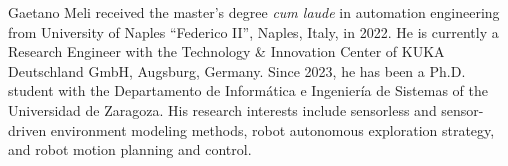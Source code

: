 
\begin{IEEEbiography}
	{Gaetano Meli}
	received the master’s degree \textit{cum laude}	in automation engineering 
	from University	of Naples “Federico II”, Naples, Italy, in 2022.
	He is currently a Research Engineer with 
	the Technology \& Innovation Center of KUKA Deutschland GmbH, Augsburg, Germany. 
	Since 2023,
	he has been a Ph.D. student with 
	the Departamento de Informática e Ingeniería de Sistemas of the Universidad de Zaragoza.
	His research interests include sensorless and sensor-driven environment modeling methods,
	robot autonomous exploration strategy, and robot motion planning and control.
\end{IEEEbiography}